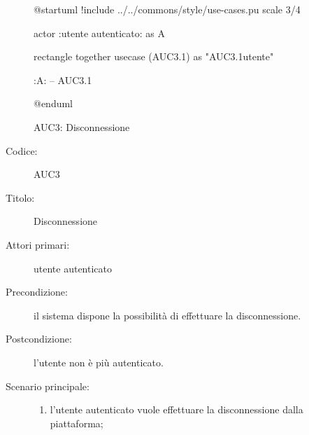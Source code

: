 \documentclass[../../../analisi-dei-requisiti.tex]{subfiles}
\begin{document}
\begin{figure}[h!]
  \centering
  \begin{plantuml}
  @startuml
  !include ../../commons/style/use-cases.pu
  scale 3/4

  actor :utente autenticato: as A

  rectangle {
    together {
      usecase (AUC3.1) as "AUC3.1\nDisconnessione utente"
    }
  }

  :A: -- AUC3.1

  @enduml
  \end{plantuml}
  \caption{AUC3: Disconnessione}
  \label{fig:auc3}
\end{figure}

\begin{description}
  \item[Codice:] AUC3
  \item[Titolo:] Disconnessione
  \item[Attori primari:] utente autenticato
  \item[Precondizione:] il sistema dispone la possibilità di effettuare la disconnessione.
  \item[Postcondizione:] l'utente non è più autenticato.
  \item[Scenario principale:]
  \begin{enumerate}
    \item l'utente autenticato vuole effettuare la disconnessione dalla piattaforma;
  \end{enumerate}
\end{description}
\end{document}

